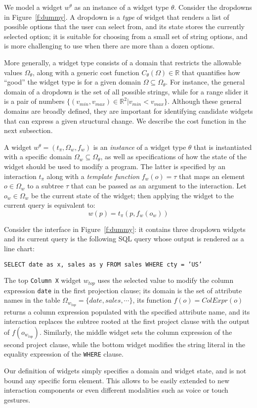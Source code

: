 We model a widget $w^\theta$ as an instance of a widget type $\theta$.  Consider the dropdowns in Figure~\ref{f:dummy}. A dropdown is a {\it type} of widget that renders a list of possible options that the user can select from, and its state stores the currently selected option; it is suitable for choosing from a small set of string options, and is more challenging to use when there are more than a dozen options.

 More generally, a widget type consists of a domain that restricts the allowable values $\Omega_\theta$, along with a generic cost function $C_\theta(\Omega) \in \mathbb{R}$ that quantifies how ``good'' the widget type is for a given domain $\Omega \subseteq \Omega_\theta$.  For instance, the general domain of a dropdown is the set of all possible strings, while for a range slider it is a pair of numbers $\{(v_{min}, v_{max}) \in \mathbb{R}^2 | v_{min} < v_{max}\}$.  Although these general domains are broadly defined, they are important for identifying candidate widgets that can express a given structural change.  We describe the cost function in the next subsection.

A widget $w^\theta = (t_{\pi}, \Omega_w, f_w)$ is an {\it instance} of a widget type $\theta$ that is instantiated with a specific domain $\Omega_w \subseteq \Omega_\theta$, as well as specifications of how the state of the widget should be used to modify a program.  The latter is specified by an interaction $t_{\pi}$ along with a {\it template function} $f_w(o) = \tau$ that maps an element $o \in \Omega_w$ to a subtree $\tau$ that can be passed as an argument to the interaction. Let $o_{w} \in \Omega_w$ be the current state of the widget; then applying the widget to the current query is equivalent to:
$$w(p) = t_{\pi}(p, f_w(o_w))$$

\begin{example}
Consider the interface in Figure~\ref{f:dummy}: it contains three dropdown widgets and its current query is the following SQL query whose output is rendered as a line chart: {\small\begin{center}
\texttt{SELECT date as x, sales as y FROM sales WHERE cty = 'US'}
\end{center}} The top \texttt{Column X} widget $w_{top}$ uses the selected value to modify the column expression \texttt{date} in the first projection clause; its domain is the set of attribute names in the table $\Omega_{w_{top}} = \{date, sales, \cdots\}$, its function $f(o) = ColExpr(o)$ returns a column expression populated with the specified attribute name, and its interaction replaces the subtree rooted at the first project clause with the output of $f(o_{w_{top}})$. Similarly, the middle widget sets the column expression of the second project clause, while the bottom widget modifies the string literal in the equality expression of the \texttt{WHERE} clause.
\end{example}
Our definition of widgets simply specifies a domain and widget state, and is not bound any specific form element.  This allows \sys to be easily extended to new interaction components or even different modalities such as voice or touch gestures.

